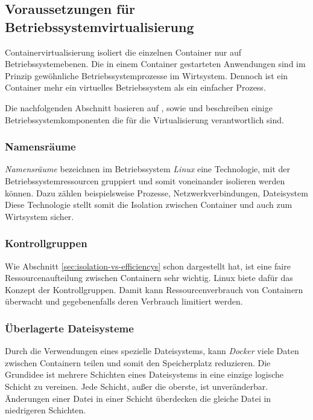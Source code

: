 \subsection{Voraussetzungen für Betriebssystemvirtualisierung}
\label{subsec:docker-tech}

Containervirtualisierung isoliert die einzelnen Container nur auf Betriebssystemebenen. Die in einem Container gestarteten Anwendungen sind im Prinzip gewöhnliche Betriebssystemprozesse im Wirtsystem. Dennoch ist ein Container mehr ein virtuelles Betriebssystem als ein einfacher Prozess.

Die nachfolgenden Abschnitt basieren auf \cite{Merkel:2014:DLL:2600239.2600241}, sowie \cite{DBLP:journals/corr/Bui15} und beschreiben einige Betriebssystemkomponenten die für die Virtualisierung verantwortlich sind.

\subsubsection{Namensräume}

\textit{Namensräume} bezeichnen im Betriebssystem \textit{Linux} eine Technologie, mit der Betriebssystemressourcen gruppiert und somit voneinander isolieren werden können. Dazu zählen beispielsweise Prozesse, Netzwerkverbindungen, Dateisystem \usw Diese Technologie stellt somit die Isolation zwischen Container und auch zum Wirtsystem sicher.

\subsubsection{Kontrollgruppen}

Wie Abschnitt \ref{sec:isolation-vs-efficiencys} schon dargestellt hat, ist eine faire Ressourcenaufteilung zwischen Containern sehr wichtig. Linux biete dafür das Konzept der Kontrollgruppen. Damit kann Ressourcenverbrauch von Containern überwacht und gegebenenfalls deren Verbrauch limitiert werden.

\subsubsection{Überlagerte Dateisysteme}

Durch die Verwendungen eines spezielle Dateisystems, kann \textit{Docker} viele Daten zwischen Containern teilen und somit den Speicherplatz reduzieren. Die Grundidee ist mehrere Schichten eines Dateisystems in eine einzige logische Schicht zu vereinen. Jede Schicht, außer die oberste, ist unveränderbar. Änderungen einer Datei in einer Schicht überdecken die gleiche Datei in niedrigeren Schichten.

